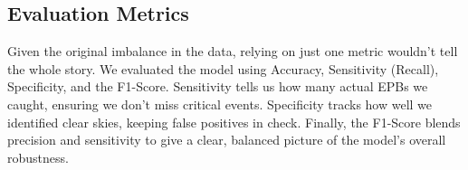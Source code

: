 \subsection{Evaluation Metrics}
Given the original imbalance in the data, relying on just one metric wouldn't tell the whole story. We evaluated the model using Accuracy, Sensitivity (Recall), Specificity, and the F1-Score. Sensitivity tells us how many actual EPBs we caught, ensuring we don't miss critical events. Specificity tracks how well we identified clear skies, keeping false positives in check. Finally, the F1-Score blends precision and sensitivity to give a clear, balanced picture of the model's overall robustness.
